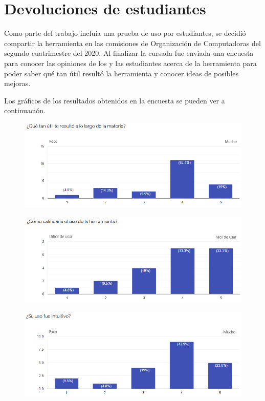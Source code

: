 \part{Devoluciones de estudiantes}
\label{devoluciones}
Como parte del trabajo incluía una prueba de uso por estudiantes, se decidió compartir la herramienta en las comisiones de Organización de Computadoras
del segundo cuatrimestre del 2020.
Al finalizar la cursada fue enviada una encuesta para conocer las opiniones de los y las estudiantes acerca de la herramienta para poder saber qué tan útil resultó la herramienta y conocer ideas de posibles mejoras.

Los gráficos de los resultados obtenidos en la encuesta se pueden ver a continuación.
\begin{figure}[H]
  \centering
  \includegraphics[width=16cm]{figuras/01_encuesta_que_tan_util.png}
\end{figure}

\begin{figure}[H]
  \centering
  \includegraphics[width=16cm]{figuras/02_encuesta_uso.png}
\end{figure}

\begin{figure}[H]
  \centering
  \includegraphics[width=16cm]{figuras/03_encuesta_uso_intuitivo.png}
\end{figure}

